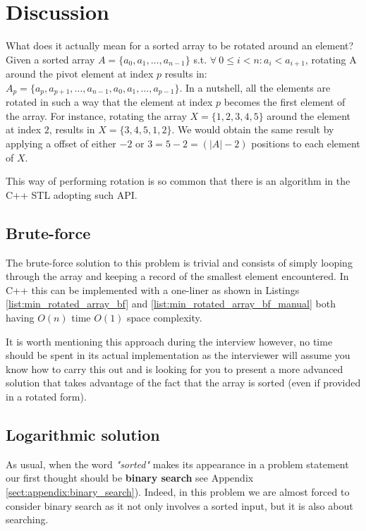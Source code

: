 \section{Discussion}
\label{min_rotated_array:sec:discussion}
What does it actually mean for a sorted array to be rotated around an element? Given a sorted array $A=\{a_0, a_1, \ldots,a_{n-1}\}$ s.t. $ \forall \: 0 \leq i < n: a_i < a_{i+1}$, rotating A around the pivot element at index $p$ results in: $A_p=\{a_p, a_{p+1}, \ldots,a_{n-1}, a_0, a_1, \ldots, a_{p-1}\}$. In a nutshell, all the elements are rotated in such a way that the element at index $p$ becomes the first element of the array. For instance, rotating the array $X=\{1,2,3,4,5\}$ around the element at index $2$, results in $X=\{3,4,5,1,2\}$. We would obtain the same result by applying a offset of either $-2$ or $3=5-2=(|A|-2)$ positions to each element of $X$. 

This way of performing rotation is so common that there is an algorithm in the C++ STL\cite{cit::std::rotate} adopting such API.

\subsection{Brute-force}
\label{min_rotated_array:sec:bruteforce}
The brute-force solution to this problem is trivial and consists of simply looping through the array and keeping a record of the smallest element encountered.
In C++ this can be implemented with a one-liner as shown in Listings \ref{list:min_rotated_array_bf} and \ref{list:min_rotated_array_bf_manual} both having $O(n)$ time $O(1)$ space complexity.





It is worth mentioning this approach during the interview however, no time should be spent in its actual implementation as the interviewer will assume you know how to carry this out and is looking for you to present a more advanced solution that takes advantage of the fact that the array is sorted (even if provided in a rotated form).


\subsection{Logarithmic solution}
\label{min_rotated_array:sec:log}
As usual, when the word \textit{"sorted"} makes its appearance in a problem statement our first thought should be \textbf{binary search} see Appendix \ref{sect:appendix:binary_search}). Indeed, in this problem we are almost forced to consider binary search as it not only involves a sorted input, but it is also about searching. 

